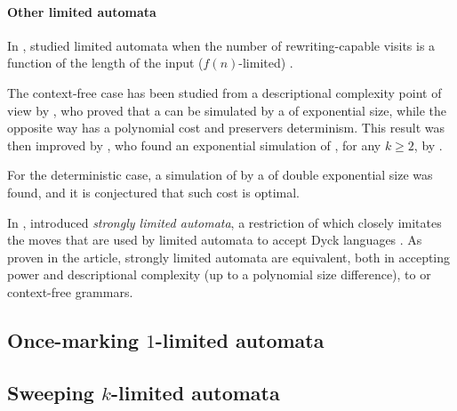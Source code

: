 \paragraph{Other limited automata}
In \citeyear{WecBra79}, \citeauthor{WecBra79} studied limited automata when the number of rewriting-capable visits is a function of the length of the input ($f(n)$-limited) \cite{WecBra79}.

The context-free case has been studied from a descriptional complexity point of view by \citeauthor{PigPis15}, who proved that a  can be simulated by a \PDA of exponential size, while the opposite way has a polynomial cost and preservers determinism.
This result was then improved by \cite{KutPig+18}, who found an exponential simulation of \kLA, for any $k\ge2$, by \PDA \cite{KutPig+18}.

For the deterministic case, a simulation of  by a \DPDA of double exponential size was found, and it is conjectured that such cost is optimal.

In \citeyear{Pig16}, \citeauthor{Pig16} introduced \emph{strongly limited automata}, a restriction of  which closely imitates the moves that are used by limited automata to accept Dyck languages \cite{Pig16}.
As proven in the article, strongly limited automata are equivalent, both in accepting power and descriptional complexity (up to a polynomial size difference), to \PDAs or context-free grammars.


\subsection{Once-marking \texorpdfstring{$1$}{1}-limited automata}


\subsection{Sweeping \texorpdfstring{$k$}{k}-limited automata}
